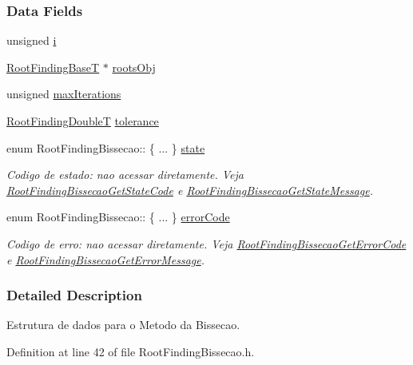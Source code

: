 \subsubsection*{Data Fields}
\begin{CompactItemize}
\item 
unsigned \hyperlink{structRootFindingBissecao_d6eeba6745ed7dc5d390846473c9b817}{i}
\item 
\hyperlink{structRootFindingBase}{RootFindingBaseT} $\ast$ \hyperlink{structRootFindingBissecao_5041e5b19cdb436273b9d11557aa8c63}{rootsObj}
\item 
unsigned \hyperlink{structRootFindingBissecao_06b978677910f6ff08dd4a521aba0c83}{maxIterations}
\item 
\hyperlink{RootFindingCommon_8h_a296fe63994e03408c4ad62794d472e9}{RootFindingDoubleT} \hyperlink{structRootFindingBissecao_94385d4daec400300058b676fa1637a6}{tolerance}
\item 
enum RootFindingBissecao:: \{ ... \}  \hyperlink{structRootFindingBissecao_313716e085ac144a01b911d1e2666cd0}{state}
\begin{CompactList}\small\item\em Codigo de estado: nao acessar diretamente. Veja \hyperlink{group____bissecao_g2ab4fb7daf5901001d011ee85dc4cfe0}{RootFindingBissecaoGetStateCode} e \hyperlink{group____bissecao_gb0455a1f4f30b2e8916d9dff5c237be1}{RootFindingBissecaoGetStateMessage}. \item\end{CompactList}\item 
enum RootFindingBissecao:: \{ ... \}  \hyperlink{structRootFindingBissecao_a184500b7a23507c3ea2e270e455a4c0}{errorCode}
\begin{CompactList}\small\item\em Codigo de erro: nao acessar diretamente. Veja \hyperlink{group____bissecao_g9672d1ca4387db1792f8219968118900}{RootFindingBissecaoGetErrorCode} e \hyperlink{group____bissecao_g77e94d3a9b5999461aabeca3bfe1837a}{RootFindingBissecaoGetErrorMessage}. \item\end{CompactList}\end{CompactItemize}


\subsubsection{Detailed Description}
Estrutura de dados para o Metodo da Bissecao. 

Definition at line 42 of file RootFindingBissecao.h.

